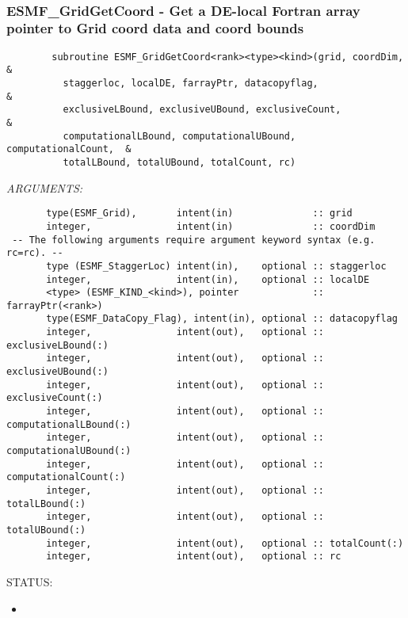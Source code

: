  
\mbox{}\hrulefill\ 
 

  \label{API:GridGetCoord}\subsubsection [ESMF\_GridGetCoord] {ESMF\_GridGetCoord - Get a DE-local Fortran array pointer to Grid coord data and coord bounds}


  
\begin{verbatim}        subroutine ESMF_GridGetCoord<rank><type><kind>(grid, coordDim,    &
          staggerloc, localDE, farrayPtr, datacopyflag,                  &
          exclusiveLBound, exclusiveUBound, exclusiveCount,              &
          computationalLBound, computationalUBound, computationalCount,  &
          totalLBound, totalUBound, totalCount, rc)\end{verbatim}{\em ARGUMENTS:}
\begin{verbatim}       type(ESMF_Grid),       intent(in)              :: grid
       integer,               intent(in)              :: coordDim
 -- The following arguments require argument keyword syntax (e.g. rc=rc). --
       type (ESMF_StaggerLoc) intent(in),    optional :: staggerloc
       integer,               intent(in),    optional :: localDE
       <type> (ESMF_KIND_<kind>), pointer             :: farrayPtr(<rank>)
       type(ESMF_DataCopy_Flag), intent(in), optional :: datacopyflag
       integer,               intent(out),   optional :: exclusiveLBound(:)
       integer,               intent(out),   optional :: exclusiveUBound(:)
       integer,               intent(out),   optional :: exclusiveCount(:)
       integer,               intent(out),   optional :: computationalLBound(:)
       integer,               intent(out),   optional :: computationalUBound(:)
       integer,               intent(out),   optional :: computationalCount(:)
       integer,               intent(out),   optional :: totalLBound(:)
       integer,               intent(out),   optional :: totalUBound(:)
       integer,               intent(out),   optional :: totalCount(:)
       integer,               intent(out),   optional :: rc\end{verbatim}
{\sf STATUS:}
   \begin{itemize}
   \item{}
   \end{itemize}
  
